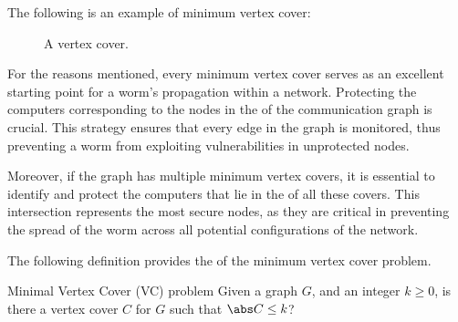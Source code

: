 \documentclass[a4paper, 12pt]{report}
\begin{document}
    \begin{example}
        The following is an example of minimum vertex cover:

        \begin{figure}[H]
            \centering
            \caption{A vertex cover.}
        \end{figure}

    \end{example}

    For the reasons mentioned, every minimum vertex cover serves as an excellent starting point for a worm's propagation within a network. Protecting the computers corresponding to the nodes in the  of the communication graph is crucial. This strategy ensures that every edge in the graph is monitored, thus preventing a worm from exploiting vulnerabilities in unprotected nodes.

    Moreover, if the graph has multiple minimum vertex covers, it is essential to identify and protect  the computers that lie in the  of all these covers. This intersection represents the most secure nodes, as they are critical in preventing the spread of the worm across all potential configurations of the network.

    The following definition provides the  of the minimum vertex cover problem.

    \begin{frameddefn}{Minimal Vertex Cover (VC) problem}
        Given a graph $G$, and an integer $k \ge 0$, is there a vertex cover $C$ for $G$ such that $\abs C \le k$?
    \end{frameddefn}
\end{document}
